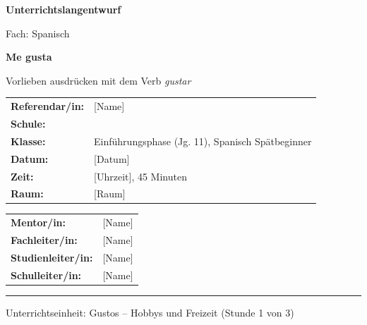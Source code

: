 \documentclass[11pt, a4paper]{article}
\newcommand{\es}[1]{\textcolor{spanisch}{\textit{#1}}}
\begin{document}

\thispagestyle{empty}

\begin{center}
    \vspace*{2cm}

    {\Large\bfseries Unterrichtslangentwurf}

    \vspace{0.5cm}

    {\large Fach: Spanisch}

    \vspace{2cm}

    {\LARGE\bfseries\color{spanisch} Me gusta}

    \vspace{0.3cm}

    {\large Vorlieben ausdrücken mit dem Verb \es{gustar}}

    \vspace{3cm}

    \begin{tabular}{ll}
        \textbf{Referendar/in:} & [Name] \\[6pt]
        \textbf{Schule:} & \underline{\hspace{5cm}} \\[6pt]
        \textbf{Klasse:} & Einführungsphase (Jg. 11), Spanisch Spätbeginner \\[6pt]
        \textbf{Datum:} & [Datum] \\[6pt]
        \textbf{Zeit:} & [Uhrzeit], 45 Minuten \\[6pt]
        \textbf{Raum:} & [Raum] \\[6pt]
    \end{tabular}

    \vspace{2cm}

    \begin{tabular}{ll}
        \textbf{Mentor/in:} & [Name] \\[6pt]
        \textbf{Fachleiter/in:} & [Name] \\[6pt]
        \textbf{Studienleiter/in:} & [Name] \\[6pt]
        \textbf{Schulleiter/in:} & [Name] \\[6pt]
    \end{tabular}

    \vfill

    \hrule
    \vspace{0.3cm}
    {\small\color{grau} Unterrichtseinheit: Gustos -- Hobbys und Freizeit (Stunde 1 von 3)}

\end{center}
\end{document}
